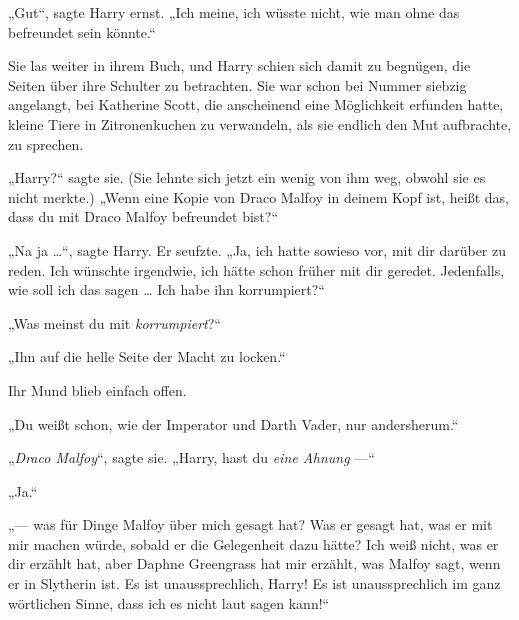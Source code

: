 „Gut“, sagte Harry ernst.
„Ich meine, ich wüsste nicht, wie man ohne das befreundet sein könnte.“


Sie las weiter in ihrem Buch, und Harry schien sich damit zu begnügen, die Seiten über ihre Schulter zu betrachten. Sie war schon bei Nummer siebzig angelangt, bei Katherine Scott, die anscheinend eine Möglichkeit erfunden hatte, kleine Tiere in Zitronenkuchen zu verwandeln, als sie endlich den Mut aufbrachte, zu sprechen.

„Harry?“ sagte sie. (Sie lehnte sich jetzt ein wenig von ihm weg, obwohl sie es nicht merkte.)
„Wenn eine Kopie von Draco Malfoy in deinem Kopf ist, heißt das, dass du mit Draco Malfoy befreundet bist?“

„Na ja …“, sagte Harry. Er seufzte.
„Ja, ich hatte sowieso vor, mit dir darüber zu reden. Ich wünschte irgendwie, ich hätte schon früher mit dir geredet. Jedenfalls, wie soll ich das sagen … Ich habe ihn korrumpiert?“

„Was meinst du mit \emph{korrumpiert}?“

„Ihn auf die helle Seite der Macht zu locken.“

Ihr Mund blieb einfach offen.

„Du weißt schon, wie der Imperator und Darth Vader, nur andersherum.“

„\emph{Draco Malfoy}“, sagte sie.
„Harry, hast du \emph{eine Ahnung} —“

„Ja.“

„— was für Dinge Malfoy über mich gesagt hat? Was er gesagt hat, was er mit mir machen würde, sobald er die Gelegenheit dazu hätte? Ich weiß nicht, was er dir erzählt hat, aber Daphne Greengrass hat mir erzählt, was Malfoy sagt, wenn er in Slytherin ist. Es ist unaussprechlich, Harry! Es ist unaussprechlich im ganz wörtlichen Sinne, dass ich es nicht laut sagen kann!“

